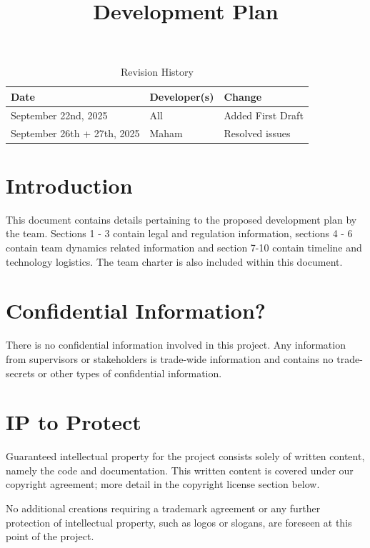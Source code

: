 \documentclass{article}
\title{Development Plan\\\progname}
\author{\authname}
\date{}
\begin{document}
\maketitle

\begin{table}[hp]
\caption{Revision History} \label{TblRevisionHistory}
\begin{tabularx}{\textwidth}{llX}
\toprule
\textbf{Date} & \textbf{Developer(s)} & \textbf{Change}\\
\midrule
September 22nd, 2025 & All & Added First Draft \\
September 26th + 27th, 2025 & Maham & Resolved issues \\
\bottomrule
\end{tabularx}
\end{table}

\newpage{}

\section{Introduction}
This document contains details pertaining to the proposed development plan by the team.
Sections 1 - 3 contain legal and regulation information, sections 4 - 6 contain team dynamics related information and 
section 7-10 contain timeline and technology logistics. The team charter is also included within this document. \\


\section{Confidential Information?}
There is no confidential information involved in this project. Any information
from supervisors or stakeholders is trade-wide information and contains
no trade-secrets or other types of confidential information.

\section{IP to Protect}
Guaranteed intellectual property for the project consists solely of written
content, namely the code and documentation. This written content is covered
under our copyright agreement; more detail in the copyright license section
below.

No additional creations requiring a trademark agreement or any further
protection of intellectual property, such as logos or slogans, are foreseen
at this point of the project.
\end{document}

